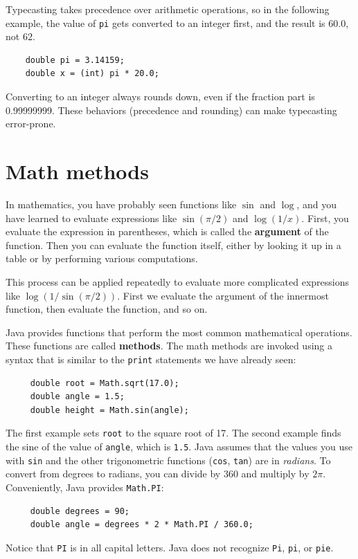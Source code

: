 \documentclass[12pt]{book}
\theoremstyle{exercise}
\begin{document}
Typecasting takes precedence over arithmetic operations,
so in the following example, the value of {\tt pi} gets
converted to an integer first, and the result
is 60.0, not 62.

\begin{lstlisting}
    double pi = 3.14159;
    double x = (int) pi * 20.0;
\end{lstlisting}
%
Converting to an integer always rounds down, even if the fraction
part is 0.99999999.  These behaviors (precedence and rounding)
can make typecasting error-prone.


\section{Math methods}

In mathematics, you have probably seen functions like $\sin$ and
$\log$, and you have learned to evaluate expressions like
$\sin(\pi/2)$ and $\log(1/x)$.  First, you evaluate the
expression in parentheses, which is called the {\bf argument} of the
function.
Then you can evaluate the function itself, either by looking it up in
a table or by performing various computations.

This process can be applied repeatedly to evaluate more complicated
expressions like $\log(1/\sin(\pi/2))$.  First we evaluate the
argument of the innermost function, then evaluate the function,
and so on.

Java provides functions that perform the most
common mathematical operations.  These functions
are called {\bf methods}.
The math methods are invoked using a syntax that is similar to
the {\tt print} statements we have already seen:

\begin{lstlisting}
     double root = Math.sqrt(17.0);
     double angle = 1.5;
     double height = Math.sin(angle);
\end{lstlisting}
%
The first example sets {\tt root} to the square root of 17.
The second example finds the sine of the value of {\tt angle},
which is {\tt 1.5}.  Java assumes that the
values you use with {\tt sin} and the other trigonometric functions
({\tt cos}, {\tt tan}) are in {\em radians}.  To
convert from degrees to radians, you can divide by 360
and multiply by $2 \pi$.  Conveniently, Java provides {\tt Math.PI}:

\begin{lstlisting}
     double degrees = 90;
     double angle = degrees * 2 * Math.PI / 360.0;
\end{lstlisting}
%
Notice that {\tt PI} is in all capital letters.  Java does
not recognize {\tt Pi}, {\tt pi}, or {\tt pie}.
\end{document}
